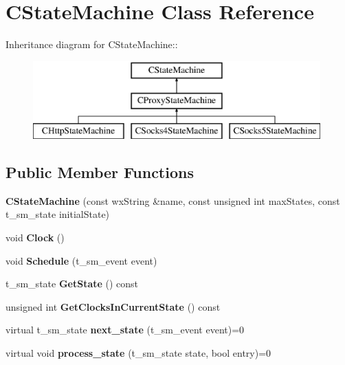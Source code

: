 \section{CStateMachine Class Reference}
\label{classCStateMachine}
Inheritance diagram for CStateMachine::\begin{figure}[H]
\begin{center}
\leavevmode
\includegraphics[height=3cm]{classCStateMachine}
\end{center}
\end{figure}
\subsection*{Public Member Functions}
\begin{DoxyCompactItemize}
\item 
{\bfseries CStateMachine} (const wxString \&name, const unsigned int maxStates, const t\_\-sm\_\-state initialState)\label{classCStateMachine_a59a46b238f8ee702faf5ecabd82b9593}

\item 
void {\bfseries Clock} ()\label{classCStateMachine_a63eb06935199833937522149f7727a9f}

\item 
void {\bfseries Schedule} (t\_\-sm\_\-event event)\label{classCStateMachine_ad4e73bd7a60624fcea887cc6a0b90348}

\item 
t\_\-sm\_\-state {\bfseries GetState} () const \label{classCStateMachine_a2c2679ad5cea45e66e6c39f2b9bc7df1}

\item 
unsigned int {\bfseries GetClocksInCurrentState} () const \label{classCStateMachine_a5fd0fbe06d06ea3ac78a4170e551d47d}

\item 
virtual t\_\-sm\_\-state {\bfseries next\_\-state} (t\_\-sm\_\-event event)=0\label{classCStateMachine_a4d119d929563271e5bdae55267cb41b0}

\item 
virtual void {\bfseries process\_\-state} (t\_\-sm\_\-state state, bool entry)=0\label{classCStateMachine_a11451243383033dacfc952496de4e660}

\end{DoxyCompactItemize}
